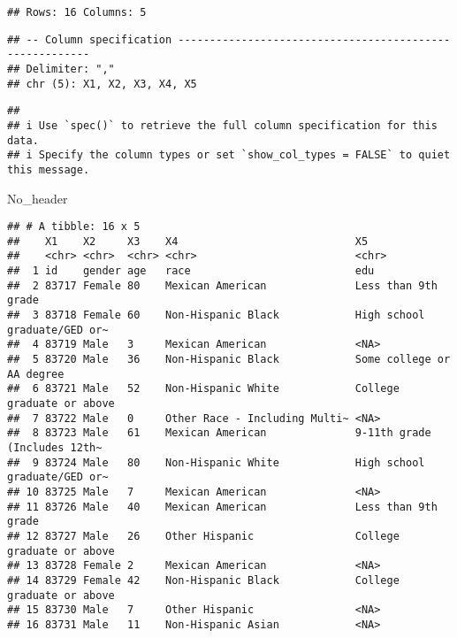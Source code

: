 \documentclass[
]{book}
\newenvironment{Shaded}{\begin{snugshade}}{\end{snugshade}}
\newcommand{\NormalTok}[1]{#1}
\begin{document}
\begin{verbatim}
## Rows: 16 Columns: 5
\end{verbatim}

\begin{verbatim}
## -- Column specification --------------------------------------------------------
## Delimiter: ","
## chr (5): X1, X2, X3, X4, X5
\end{verbatim}

\begin{verbatim}
## 
## i Use `spec()` to retrieve the full column specification for this data.
## i Specify the column types or set `show_col_types = FALSE` to quiet this message.
\end{verbatim}

\begin{Shaded}
\begin{Highlighting}[]
\NormalTok{No\_header}
\end{Highlighting}
\end{Shaded}

\begin{verbatim}
## # A tibble: 16 x 5
##    X1    X2     X3    X4                            X5                          
##    <chr> <chr>  <chr> <chr>                         <chr>                       
##  1 id    gender age   race                          edu                         
##  2 83717 Female 80    Mexican American              Less than 9th grade         
##  3 83718 Female 60    Non-Hispanic Black            High school graduate/GED or~
##  4 83719 Male   3     Mexican American              <NA>                        
##  5 83720 Male   36    Non-Hispanic Black            Some college or AA degree   
##  6 83721 Male   52    Non-Hispanic White            College graduate or above   
##  7 83722 Male   0     Other Race - Including Multi~ <NA>                        
##  8 83723 Male   61    Mexican American              9-11th grade (Includes 12th~
##  9 83724 Male   80    Non-Hispanic White            High school graduate/GED or~
## 10 83725 Male   7     Mexican American              <NA>                        
## 11 83726 Male   40    Mexican American              Less than 9th grade         
## 12 83727 Male   26    Other Hispanic                College graduate or above   
## 13 83728 Female 2     Mexican American              <NA>                        
## 14 83729 Female 42    Non-Hispanic Black            College graduate or above   
## 15 83730 Male   7     Other Hispanic                <NA>                        
## 16 83731 Male   11    Non-Hispanic Asian            <NA>
\end{verbatim}
\end{document}
